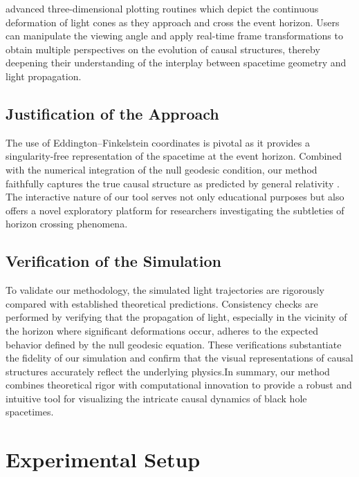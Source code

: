 \documentclass{article}
\begin{document}
advanced three-dimensional plotting routines which depict the continuous deformation of light cones as they approach and cross the event horizon. Users can manipulate the viewing angle and apply real-time frame transformations to obtain multiple perspectives on the evolution of causal structures, thereby deepening their understanding of the interplay between spacetime geometry and light propagation.\subsection{Justification of the Approach}The use of Eddington--Finkelstein coordinates is pivotal as it provides a singularity-free representation of the spacetime at the event horizon. Combined with the numerical integration of the null geodesic condition, our method faithfully captures the true causal structure as predicted by general relativity \cite{ref1, ref2}. The interactive nature of our tool serves not only educational purposes but also offers a novel exploratory platform for researchers investigating the subtleties of horizon crossing phenomena.\subsection{Verification of the Simulation}To validate our methodology, the simulated light trajectories are rigorously compared with established theoretical predictions. Consistency checks are performed by verifying that the propagation of light, especially in the vicinity of the horizon where significant deformations occur, adheres to the expected behavior defined by the null geodesic equation. These verifications substantiate the fidelity of our simulation and confirm that the visual representations of causal structures accurately reflect the underlying physics.In summary, our method combines theoretical rigor with computational innovation to provide a robust and intuitive tool for visualizing the intricate causal dynamics of black hole spacetimes.\section{Experimental Setup}
\end{document}
